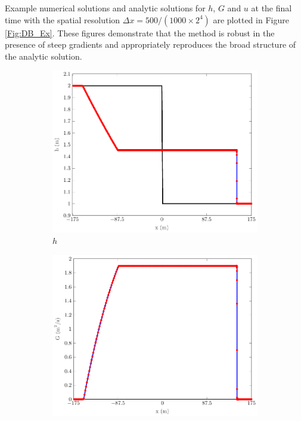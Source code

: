 \documentclass[10pt]{elsarticle}
\begin{document}
Example numerical solutions and analytic solutions for $h$, $G$ and $u$ at the final time with the spatial resolution $\Delta x = 500 / (1000 \times 2^{4})$ are plotted in Figure \ref{Fig:DB_Ex}. These figures demonstrate that the method is robust in the presence of steep gradients and appropriately reproduces the broad structure of the analytic solution. 
%
\begin{figure}
	\centering
	\begin{subfigure}{0.32\textwidth}
		\centering
		\includegraphics[width=\textwidth]{./Figures/Simulations/Validation/DBSWWE/h.pdf}
		\caption{$h$}
	\end{subfigure}
	\begin{subfigure}{0.32\textwidth}
		\centering
		\includegraphics[width=\textwidth]{./Figures/Simulations/Validation/DBSWWE/G.pdf}

\end{subfigure}
\end{figure}
\end{document}
